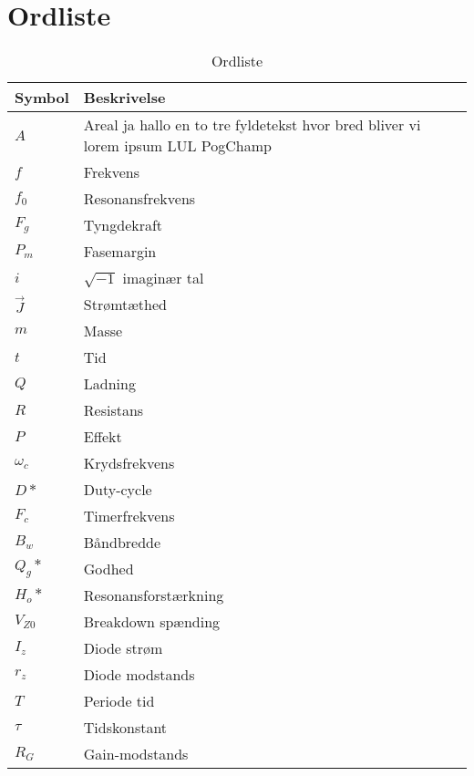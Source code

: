 \chapter{Ordliste} \label{bilag:ordliste}

\begin{table}[h!]
	\centering
	\caption{Ordliste}
	\label{tab:ordliste}
	\begin{threeparttable}
		\begin{tabular}{l l}
			\toprule
			\multicolumn{1}{l}{Symbol}       &
			\multicolumn{1}{l}{Beskrivelse}  \\ 
			\midrule
			$A$					& Areal ja hallo en to tre fyldetekst hvor bred bliver vi lorem ipsum LUL PogChamp		\\
			$f$					& Frekvens		\\
			$f_0$				& Resonansfrekvens \\
			$F_g$				& Tyngdekraft	\\
			$P_{m}$				& Fasemargin	\\
			$i$\tnote{*}		& $\sqrt{-1}$ imaginær tal	\\
			$\vec{J}$			& Strømtæthed	\\
			$m$			  		& Masse \\
			$t$			  		& Tid \\
			$Q$					& Ladning \\
			$R$					& Resistans \\
			$P$					& Effekt \\
			$\omega_{c}$		& Krydsfrekvens	\\
			$D*$				& Duty-cycle\\
			$F_c$				& Timerfrekvens\\
			$B_w$				& Båndbredde\\
			$Q_g*$				& Godhed\\
			$H_o*$				& Resonansforstærkning\\
			$V_{Z0}$			& Breakdown spænding\\
			$I_z$				& Diode strøm\\
			$r_z$				& Diode modstands\\
			$T$					& Periode tid\\
			$\tau$				& Tidskonstant\\
			$R_G$				& Gain-modstands\\
			
			\bottomrule
		\end{tabular}
	\end{threeparttable}
\end{table}